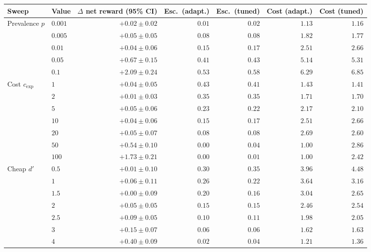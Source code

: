 \begin{tabular}{llrrrrr}
\toprule
Sweep & Value & $\Delta$ net reward (95\% CI) & Esc.\ (adapt.) & Esc.\ (tuned) & Cost (adapt.) & Cost (tuned) \\
\midrule
Prevalence $p$ & $0.001$ & $\mathbf{+0.02} \pm \mathbf{0.02}$ & $0.01$ & $0.02$ & $1.13$ & $1.16$ \\
 & $0.005$ & $+0.05 \pm 0.05$ & $0.08$ & $0.08$ & $1.82$ & $1.77$ \\
 & $0.01$ & $+0.04 \pm 0.06$ & $0.15$ & $0.17$ & $2.51$ & $2.66$ \\
 & $0.05$ & $\mathbf{+0.67} \pm \mathbf{0.15}$ & $0.41$ & $0.43$ & $5.14$ & $5.31$ \\
 & $0.1$ & $\mathbf{+2.09} \pm \mathbf{0.24}$ & $0.53$ & $0.58$ & $6.29$ & $6.85$ \\
\addlinespace
Cost $c_{\mathrm{exp}}$ & $1$ & $+0.04 \pm 0.05$ & $0.43$ & $0.41$ & $1.43$ & $1.41$ \\
 & $2$ & $+0.01 \pm 0.03$ & $0.35$ & $0.35$ & $1.71$ & $1.70$ \\
 & $5$ & $+0.05 \pm 0.06$ & $0.23$ & $0.22$ & $2.17$ & $2.10$ \\
 & $10$ & $+0.04 \pm 0.06$ & $0.15$ & $0.17$ & $2.51$ & $2.66$ \\
 & $20$ & $+0.05 \pm 0.07$ & $0.08$ & $0.08$ & $2.69$ & $2.60$ \\
 & $50$ & $\mathbf{+0.54} \pm \mathbf{0.10}$ & $0.00$ & $0.04$ & $1.00$ & $2.86$ \\
 & $100$ & $\mathbf{+1.73} \pm \mathbf{0.21}$ & $0.00$ & $0.01$ & $1.00$ & $2.42$ \\
\addlinespace
Cheap $d'$ & $0.5$ & $+0.01 \pm 0.10$ & $0.30$ & $0.35$ & $3.96$ & $4.48$ \\
 & $1$ & $+0.06 \pm 0.11$ & $0.26$ & $0.22$ & $3.64$ & $3.16$ \\
 & $1.5$ & $+0.00 \pm 0.09$ & $0.20$ & $0.16$ & $3.04$ & $2.65$ \\
 & $2$ & $+0.05 \pm 0.05$ & $0.15$ & $0.15$ & $2.46$ & $2.54$ \\
 & $2.5$ & $\mathbf{+0.09} \pm \mathbf{0.05}$ & $0.10$ & $0.11$ & $1.98$ & $2.05$ \\
 & $3$ & $\mathbf{+0.15} \pm \mathbf{0.07}$ & $0.06$ & $0.06$ & $1.62$ & $1.63$ \\
 & $4$ & $\mathbf{+0.40} \pm \mathbf{0.09}$ & $0.02$ & $0.04$ & $1.21$ & $1.36$ \\
\bottomrule
\end{tabular}
